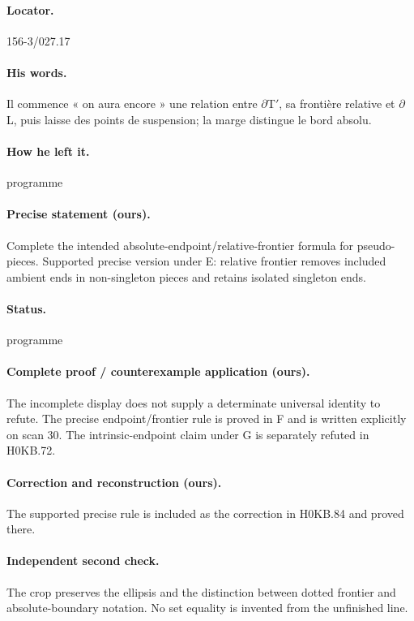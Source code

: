 \paragraph{Locator.} 156-3/027.17

\paragraph{His words.} Il commence « on aura encore » une relation entre \ensuremath{\partial}T\ensuremath{\prime}, sa frontière relative et \ensuremath{\partial}L, puis laisse des points de suspension; la marge distingue le bord absolu.

\paragraph{How he left it.} programme

\paragraph{Precise statement (ours).} Complete the intended absolute-endpoint/relative-frontier formula for pseudo-pieces. Supported precise version under E: relative frontier removes included ambient ends in non-singleton pieces and retains isolated singleton ends.

\paragraph{Status.} programme

\paragraph{Complete proof / counterexample application (ours).} The incomplete display does not supply a determinate universal identity to refute. The precise endpoint/frontier rule is proved in F and is written explicitly on scan 30. The intrinsic-endpoint claim under G is separately refuted in H0KB.72.

\paragraph{Correction and reconstruction (ours).} The supported precise rule is included as the correction in H0KB.84 and proved there.

\paragraph{Independent second check.} The crop preserves the ellipsis and the distinction between dotted frontier and absolute-boundary notation. No set equality is invented from the unfinished line.


